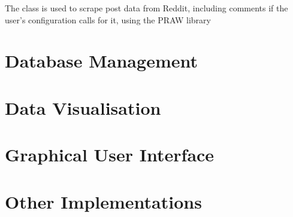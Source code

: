 The  class is used to scrape post data from Reddit, including comments if the user's configuration calls for it, using the PRAW library

\section{Database Management}

\section{Data Visualisation}

\section{Graphical User Interface}

\section{Other Implementations}